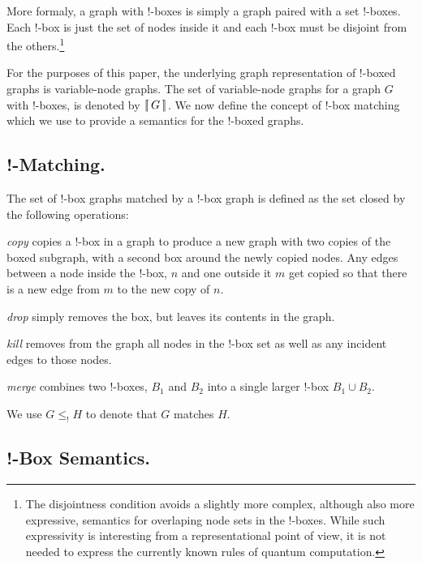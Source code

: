 \documentclass[runningheads]{llncs}
\newcommand{\binterp}[1]{\lceil\hspace{-0.27em}|\, #1\, |\hspace{-0.27em}\rceil}
\begin{document}
More formaly, a graph with !-boxes is simply a graph paired with a set
!-boxes. Each !-box is just the set of nodes inside it and each !-box
must be disjoint from the others.\footnote{The disjointness condition
  avoids a slightly more complex, although also more expressive,
  semantics for overlaping node sets in the !-boxes. While such
  expressivity is interesting from a representational point of view,
  it is not needed to express the currently known rules of quantum
  computation.}

For the purposes of this paper, the underlying graph representation of
!-boxed graphs is variable-node graphs. The set of variable-node
graphs for a graph $G$ with !-boxes, is denoted by $\binterp{G}$. We
now define the concept of !-box matching which we use to provide a
semantics for the !-boxed graphs. 

\subsection{!-Matching.}

The set of !-box graphs matched by a !-box graph is defined as the set
closed by the following operations:

\begin{definition}
  \emph{copy} copies a !-box in a graph to produce a new graph with
  two copies of the boxed subgraph, with a second box around the newly
  copied nodes. Any edges between a node inside the !-box, $n$ and one
  outside it $m$ get copied so that there is a new edge from $m$ to
  the new copy of $n$.
\end{definition}

\begin{definition}
  \emph{drop} simply removes the box, but leaves its contents in the
  graph.
\end{definition}

\begin{definition}
  \emph{kill} removes from the graph all nodes in the !-box set as
  well as any incident edges to those nodes.
\end{definition}

\begin{definition}
  \emph{merge} combines two !-boxes, $B_1$ and $B_2$ into a single
  larger !-box $B_1 \cup B_2$.
\end{definition}

\noindent We use $G \leq_! H$ to denote that $G$ matches $H$.

\subsection{!-Box Semantics.} 
\end{document}
